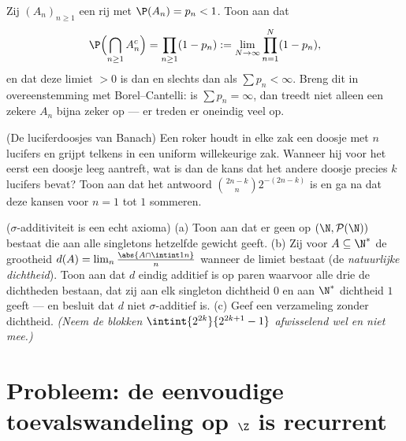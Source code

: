 \begin{exercise}[$\star\star$]\label{exo:b2:proba:10}
Zij $(A_n)_{n\geq1}$ een rij  met
$\P(A_n) = p_n < 1$. Toon aan dat
\[
\P\Bigl(\bigcap_{n\geq1}A_n^c\Bigr)
= \prod_{n\geq1}(1 - p_n)
:= \lim_{N\to\infty}\prod_{n=1}^N(1 - p_n),
\]
en dat deze limiet $> 0$ is dan en slechts dan als $\sum p_n <
\infty$. Breng dit in overeenstemming met Borel--Cantelli: is
$\sum p_n = \infty$, dan treedt niet alleen een zekere $A_n$ bijna
zeker op --- er treden er oneindig veel op.
\end{exercise}

\begin{exercise}[$\star\star$]\label{exo:b2:proba:11}
(De luciferdoosjes van Banach) Een roker houdt in elke zak een
doosje met $n$ lucifers en grijpt telkens in een uniform
willekeurige zak. Wanneer hij voor het eerst een doosje leeg
aantreft, wat is dan de kans dat het andere doosje precies $k$
lucifers bevat? Toon aan dat het antwoord
$\binom{2n-k}{n}2^{-(2n-k)}$ is en ga na dat deze kansen voor $n =
1$ tot $1$ sommeren.
\end{exercise}

\begin{exercise}[$\star\star\star$]\label{exo:b2:proba:12}
($\sigma$-additiviteit is een echt axioma)
(a) Toon aan dat er geen  op $(\N, \mathcal P(\N))$ bestaat
die aan alle singletons hetzelfde gewicht geeft.
(b) Zij voor $A \subseteq \N^*$ de grootheid $d(A) =
\lim_n\frac{\abs{A\cap\intint1n}}{n}$ wanneer de limiet bestaat (de
\emph{natuurlijke dichtheid}). Toon aan dat $d$ eindig additief is
op paren waarvoor alle drie de dichtheden bestaan, dat zij aan elk
singleton dichtheid $0$ en aan $\N^*$ dichtheid $1$ geeft --- en
besluit dat $d$ niet $\sigma$-additief is.
(c) Geef een verzameling zonder dichtheid. \emph{(Neem de blokken
$\intint{2^{2k}}{2^{2k+1}-1}$ afwisselend wel en niet mee.)}
\end{exercise}

\section{Probleem: de eenvoudige toevalswandeling op $\Z$ is
recurrent}

